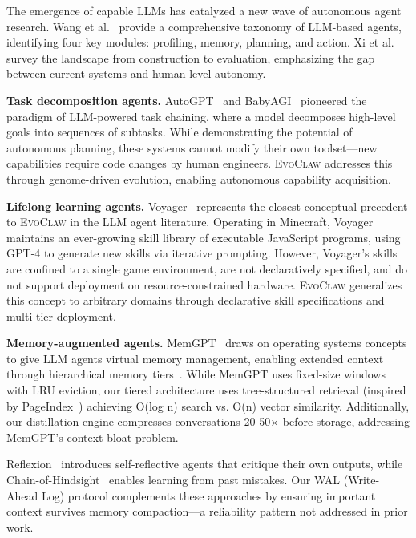 \documentclass{article}
\newcommand{\evoclaw}{\textsc{EvoClaw}}
\begin{document}
The emergence of capable LLMs has catalyzed a new wave of autonomous agent research. Wang et al.~\cite{wang2023survey} provide a comprehensive taxonomy of LLM-based agents, identifying four key modules: profiling, memory, planning, and action. Xi et al.~\cite{xi2023rise} survey the landscape from construction to evaluation, emphasizing the gap between current systems and human-level autonomy.

\textbf{Task decomposition agents.} AutoGPT~\cite{auto_gpt} and BabyAGI~\cite{babyagi} pioneered the paradigm of LLM-powered task chaining, where a model decomposes high-level goals into sequences of subtasks. While demonstrating the potential of autonomous planning, these systems cannot modify their own toolset---new capabilities require code changes by human engineers. \evoclaw{} addresses this through genome-driven evolution, enabling autonomous capability acquisition.

\textbf{Lifelong learning agents.} Voyager~\cite{wang2023voyager} represents the closest conceptual precedent to \evoclaw{} in the LLM agent literature. Operating in Minecraft, Voyager maintains an ever-growing skill library of executable JavaScript programs, using GPT-4 to generate new skills via iterative prompting. However, Voyager's skills are confined to a single game environment, are not declaratively specified, and do not support deployment on resource-constrained hardware. \evoclaw{} generalizes this concept to arbitrary domains through declarative skill specifications and multi-tier deployment.

\textbf{Memory-augmented agents.} MemGPT~\cite{packer2023memgpt} draws on operating systems concepts to give LLM agents virtual memory management, enabling extended context through hierarchical memory tiers~\cite{silberschatz2014operating}. While MemGPT uses fixed-size windows with LRU eviction, our tiered architecture uses tree-structured retrieval (inspired by PageIndex~\cite{vectifyai_pageindex}) achieving O(log n) search vs. O(n) vector similarity. Additionally, our distillation engine compresses conversations 20-50$\times$ before storage, addressing MemGPT's context bloat problem.

Reflexion~\cite{shinn2024reflexion} introduces self-reflective agents that critique their own outputs, while Chain-of-Hindsight~\cite{liu2023chain} enables learning from past mistakes. Our WAL (Write-Ahead Log) protocol complements these approaches by ensuring important context survives memory compaction---a reliability pattern not addressed in prior work.
\end{document}
